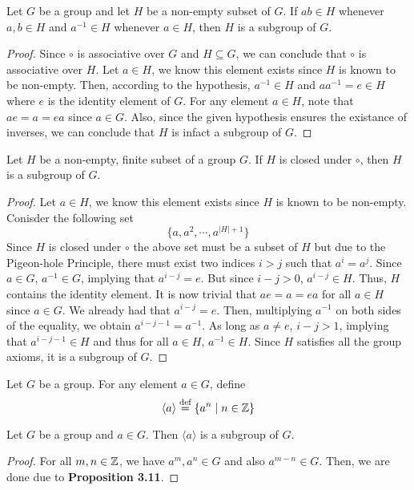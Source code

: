 \begin{proposition}
	Let $G$ be a group and let $H$ be a non-empty subset of $G$. If $ab\in H$ whenever $a,b\in H$ and $a^{-1}\in H$ whenever $a\in H$, then $H$ is a subgroup of $G$.
\end{proposition}
\begin{proof}
	Since $\circ$ is associative over $G$ and $H\subseteq G$, we can conclude that $\circ$ is associative over $H$. Let $a\in H$, we know this element exists since $H$ is known to be non-empty. Then, according to the hypothesis, $a^{-1}\in H$ and $aa^{-1}=e\in H$ where $e$ is the identity element of $G$. For any element $a\in H$, note that $ae=a=ea$ since $a\in G$. Also, since the given hypothesis ensures the existance of inverses, we can conclude that $H$ is infact a subgroup of $G$.
\end{proof}

\begin{proposition}
	Let $H$ be a non-empty, finite subset of a group $G$. If $H$ is closed under $\circ$, then $H$ is a subgroup of $G$.
\end{proposition}
\begin{proof}
	Let $a\in H$, we know this element exists since $H$ is known to be non-empty. Conisder the following set 
	$$
	\{a, a^2, \cdots, a^{|H|+1}\}
	$$
	Since $H$ is closed under $\circ$ the above set must be a subset of $H$ but due to the Pigeon-hole Principle, there must exist two indices $i>j$ such that $a^i=a^j$. Since $a\in G$, $a^{-1}\in G$, implying that $a^{i-j}=e$. But since $i-j>0$, $a^{i-j}\in H$. Thus, $H$ contains the identity element. It is now trivial that $ae=a=ea$ for all $a\in H$ since $a\in G$. We already had that $a^{i-j}=e$. Then, multiplying $a^{-1}$ on both sides of the equality, we obtain $a^{i-j-1}=a^{-1}$. As long as $a\ne e$, $i-j>1$, implying that $a^{i-j-1}\in H$ and thus for all $a\in H$, $a^{-1}\in H$. Since $H$ satisfies all the group axioms, it is a subgroup of $G$.
\end{proof}

\begin{definition}
	Let $G$ be a group. For any element $a\in G$, define 
	$$
	\langle a\rangle \stackrel{\text{def}}{=} \{a^n\mid n\in\mathbb{Z}\}
	$$
\end{definition}
\begin{proposition}
	Let $G$ be a group and $a\in G$. Then $\langle a\rangle$ is a subgroup of $G$.
\end{proposition}
\begin{proof}
	For all $m,n\in\mathbb{Z}$, we have $a^m,a^n\in G$ and also $a^{m-n}\in G$. Then, we are done due to \textbf{Proposition 3.11}.
\end{proof}

